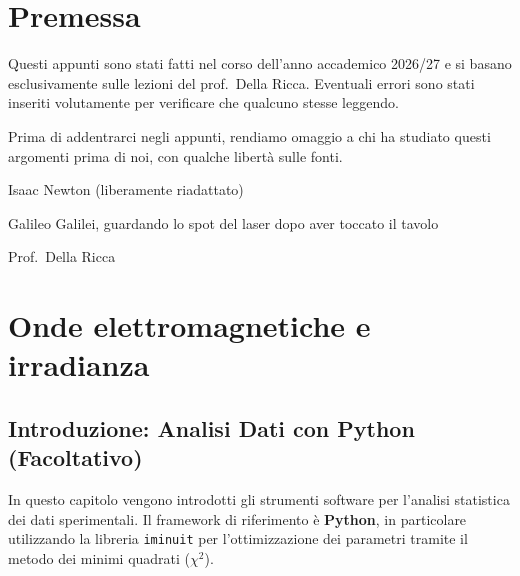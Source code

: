 \documentclass[openany,a4paper,12pt]{book}
\begin{document}
\chapter*{Premessa}
{}

Questi appunti sono stati fatti nel corso 
dell'anno accademico 2026/27 e si basano esclusivamente sulle lezioni del
prof.~Della Ricca. 
Eventuali errori sono stati inseriti volutamente per
verificare che qualcuno stesse leggendo.

\noindent Prima di addentrarci negli appunti, rendiamo omaggio a chi
ha studiato questi argomenti prima di noi, con qualche libertà sulle fonti.

%
{Isaac Newton (liberamente riadattato)}

%
{Galileo Galilei, guardando lo spot del laser dopo aver toccato il
tavolo }

{Prof.~Della Ricca}









\tableofcontents

\mainmatter %
\pagestyle{fancy}

\chapter{Onde elettromagnetiche e irradianza}

\section*{Introduzione: Analisi Dati con Python (Facoltativo)}

In questo capitolo vengono introdotti gli strumenti software per l'analisi statistica dei dati sperimentali. Il framework di riferimento è \textbf{Python}, in particolare utilizzando la libreria \texttt{iminuit} per l'ottimizzazione dei parametri tramite il metodo dei minimi quadrati ($\chi^2$).
\end{document}
